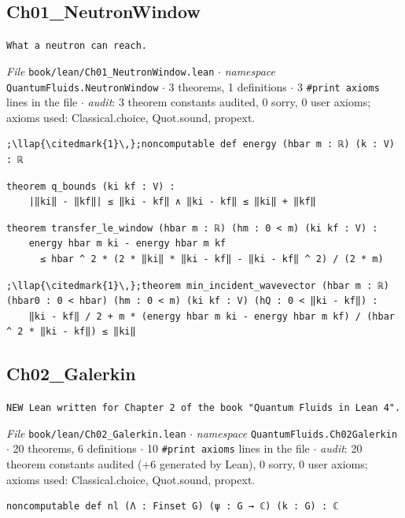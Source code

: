 \subsection{Ch01\_\allowbreak{}NeutronWindow}
{\footnotesize\raggedright\texttt{What a neutron can reach.\allowbreak{}}\par}
{\footnotesize\raggedright\emph{File} \texttt{book/lean/Ch01\_\allowbreak{}NeutronWindow.\allowbreak{}lean} $\cdot$ \emph{namespace} \texttt{QuantumFluids.\allowbreak{}NeutronWindow} $\cdot$ 3 theorems, 1 definitions $\cdot$ 3 \texttt{\#print axioms} lines in the file $\cdot$ \emph{audit}: 3 theorem constants audited, 0 sorry, 0 user axioms; axioms used: Classical.choice, Quot.sound, propext.\par}
\begin{lstlisting}[style=leancat]
;\llap{\citedmark{1}\,};noncomputable def energy (hbar m : ℝ) (k : V) : ℝ
\end{lstlisting}

\begin{lstlisting}[style=leancat]
theorem q_bounds (ki kf : V) :
    |‖ki‖ - ‖kf‖| ≤ ‖ki - kf‖ ∧ ‖ki - kf‖ ≤ ‖ki‖ + ‖kf‖
\end{lstlisting}

\begin{lstlisting}[style=leancat]
theorem transfer_le_window (hbar m : ℝ) (hm : 0 < m) (ki kf : V) :
    energy hbar m ki - energy hbar m kf
      ≤ hbar ^ 2 * (2 * ‖ki‖ * ‖ki - kf‖ - ‖ki - kf‖ ^ 2) / (2 * m)
\end{lstlisting}

\begin{lstlisting}[style=leancat]
;\llap{\citedmark{1}\,};theorem min_incident_wavevector (hbar m : ℝ) (hbar0 : 0 < hbar) (hm : 0 < m) (ki kf : V) (hQ : 0 < ‖ki - kf‖) :
    ‖ki - kf‖ / 2 + m * (energy hbar m ki - energy hbar m kf) / (hbar ^ 2 * ‖ki - kf‖) ≤ ‖ki‖
\end{lstlisting}

\subsection{Ch02\_\allowbreak{}Galerkin}
{\footnotesize\raggedright\texttt{NEW Lean written for Chapter 2 of the book "Quantum Fluids in Lean 4".\allowbreak{}}\par}
{\footnotesize\raggedright\emph{File} \texttt{book/lean/Ch02\_\allowbreak{}Galerkin.\allowbreak{}lean} $\cdot$ \emph{namespace} \texttt{QuantumFluids.\allowbreak{}Ch02Galerkin} $\cdot$ 20 theorems, 6 definitions $\cdot$ 10 \texttt{\#print axioms} lines in the file $\cdot$ \emph{audit}: 20 theorem constants audited (+6 generated by Lean), 0 sorry, 0 user axioms; axioms used: Classical.choice, Quot.sound, propext.\par}
\begin{lstlisting}[style=leancat]
noncomputable def nl (Λ : Finset G) (ψ : G → ℂ) (k : G) : ℂ
\end{lstlisting}

